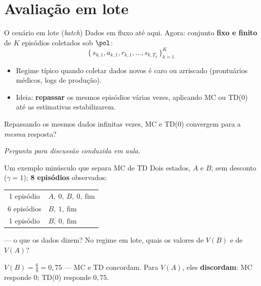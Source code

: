 \documentclass[aspectratio=169, 11pt]{beamer}
\newcommand{\paradiscussao}{\vspace{-0.2em}
  {\footnotesize\color{rlCinza}\itshape Pergunta para discussão conduzida em aula.}}
\begin{document}
\section{Avaliação em lote}

\begin{frame}{O cenário em lote (\emph{batch})}
  Dados em fluxo até aqui. Agora: conjunto \textbf{fixo e finito} de $K$
  episódios coletados sob $\pol$:
  \vspace{-0.5em}
  \[
    \{\, s_{k,1}, a_{k,1}, r_{k,1}, \ldots, s_{k,T_k} \,\}_{k=1}^{K}
  \]
  \vspace{-1.4em}
  \begin{itemize}\setlength{\itemsep}{0.2ex}
    \item Regime típico quando coletar dados novos é caro ou arriscado
      (prontuários médicos, logs de produção).
    \item Ideia: \textbf{repassar} os mesmos episódios várias vezes,
      aplicando MC ou TD(0) até as estimativas estabilizarem.
  \end{itemize}
  \vspace{-0.4em}

  \begin{quizbox}{}
    Repassando os mesmos dados infinitas vezes, MC e TD(0) convergem
    para a \emph{mesma} resposta?
  \end{quizbox}
  \paradiscussao
\end{frame}

\begin{frame}{Um exemplo minúsculo que separa MC de TD}
  Dois estados, $A$ e $B$; sem desconto ($\gamma = 1$); \textbf{8 episódios}
  observados:

  \begin{center}
  \renewcommand{\arraystretch}{1.2}
  \begin{tabular}{cl}
    1 episódio & $A,\ 0,\ B,\ 0,\ \text{fim}$\\
    6 episódios & $B,\ 1,\ \text{fim}$\\
    1 episódio & $B,\ 0,\ \text{fim}$\\
  \end{tabular}
  \end{center}

  \begin{exbox}{— o que os dados dizem?}
    No regime em lote, quais os valores de $V(B)$ e de $V(A)$?
  \end{exbox}

  \pause
  \begin{respbox}
    $V(B) = \tfrac{6}{8} = 0{,}75$ — MC e TD concordam.
    Para $V(A)$, eles \textbf{discordam}: MC responde $0$;
    TD(0) responde $0{,}75$.
  \end{respbox}
\end{frame}
\end{document}
